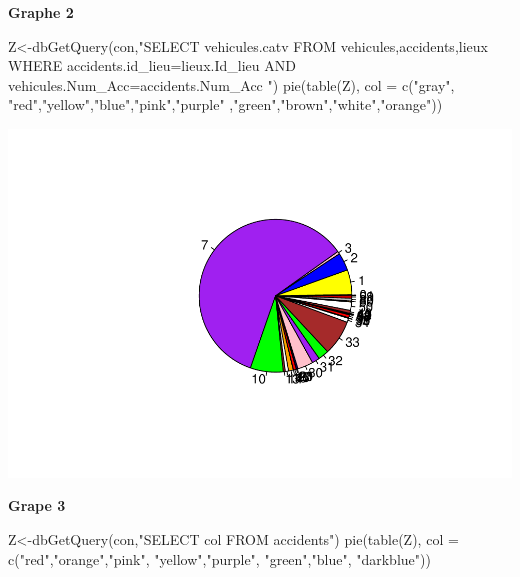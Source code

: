 \documentclass[mstat,12pt]{unswthesis}
\newenvironment{Shaded}{\begin{snugshade}}{\end{snugshade}}
\newcommand{\AttributeTok}[1]{\textcolor[rgb]{0.77,0.63,0.00}{#1}}
\newcommand{\FunctionTok}[1]{\textcolor[rgb]{0.00,0.00,0.00}{#1}}
\newcommand{\NormalTok}[1]{#1}
\newcommand{\OtherTok}[1]{\textcolor[rgb]{0.56,0.35,0.01}{#1}}
\newcommand{\StringTok}[1]{\textcolor[rgb]{0.31,0.60,0.02}{#1}}
\begin{document}
\medskip

\textbf{Graphe 2}

\begin{Shaded}
\begin{Highlighting}[]
\NormalTok{Z}\OtherTok{\textless{}{-}}\FunctionTok{dbGetQuery}\NormalTok{(con,}\StringTok{"SELECT vehicules.catv}
\StringTok{FROM vehicules,accidents,lieux}
\StringTok{WHERE accidents.id\_lieu=lieux.Id\_lieu AND vehicules.Num\_Acc=accidents.Num\_Acc }
\StringTok{"}\NormalTok{)}
\FunctionTok{pie}\NormalTok{(}\FunctionTok{table}\NormalTok{(Z), }\AttributeTok{col =} \FunctionTok{c}\NormalTok{(}\StringTok{"gray"}\NormalTok{, }\StringTok{"red"}\NormalTok{,}\StringTok{"yellow"}\NormalTok{,}\StringTok{"blue"}\NormalTok{,}\StringTok{"pink"}\NormalTok{,}\StringTok{"purple"}
\NormalTok{                      ,}\StringTok{"green"}\NormalTok{,}\StringTok{"brown"}\NormalTok{,}\StringTok{"white"}\NormalTok{,}\StringTok{"orange"}\NormalTok{))}
\end{Highlighting}
\end{Shaded}

\includegraphics{rapport-G04_files/figure-latex/unnamed-chunk-12-1.pdf}

\medskip

\textbf{Grape 3}

\begin{Shaded}
\begin{Highlighting}[]
\NormalTok{Z}\OtherTok{\textless{}{-}}\FunctionTok{dbGetQuery}\NormalTok{(con,}\StringTok{"SELECT col}
\StringTok{FROM accidents"}\NormalTok{)}
\FunctionTok{pie}\NormalTok{(}\FunctionTok{table}\NormalTok{(Z), }\AttributeTok{col =} \FunctionTok{c}\NormalTok{(}\StringTok{"red"}\NormalTok{,}\StringTok{"orange"}\NormalTok{,}\StringTok{"pink"}\NormalTok{, }\StringTok{"yellow"}\NormalTok{,}\StringTok{"purple"}\NormalTok{,}
                      \StringTok{"green"}\NormalTok{,}\StringTok{"blue"}\NormalTok{, }\StringTok{"darkblue"}\NormalTok{))}
\end{Highlighting}
\end{Shaded}
\end{document}
